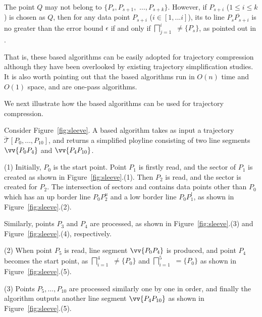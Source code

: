 The point $Q$ may not belong to $\{P_{s}, P_{s+1},$ $\ldots, P_{s+k}\}$.
However, if $P_{s+i}$ ($1\le i\le k$) is chosen as $Q$, then
for any data point $P_{s+i}$ ($i \in [1, ... i]$), its \ped to
line $\overline{P_sP_{s+i}}$ is no greater than the error bound $\epsilon$ if and only if $\bigsqcap_{j=1}^{i}$ $\ne \{P_s\}$, as pointed out in \cite{Zhao:Sleeve}.

 That is, these \cia based algorithms can be easily adopted for trajectory compression although they have been overlooked by existing trajectory simplification studies.  It is also worth pointing out that the \cia based algorithms  run in $O(n)$ time and $O(1)$ space, and are one-pass algorithms.

We next illustrate how the \cia based algorithms can be used for trajectory compression.



\begin{example}
\label{exm-alg-sleeve}
Consider Figure~\ref{fig:sleeve}. A \cia based algorithm takes as input a trajectory $\dddot{\mathcal{T}}[P_0, \ldots, P_{10}]$, and returns a simplified ployline consisting of two line segments $\vv{P_0P_4}$ and  $\vv{P_4P_{10}}$.

\sstab(1) Initially, $P_0$ is the start point. Point $P_1$ is firstly read, and the sector  of $P_1$ is created as shown in Figure~\ref{fig:sleeve}.(1).
Then $P_2$ is read, and the sector   is created for $P_2$. The intersection of sectors  and   contains data points other than $P_0$  which has an up border line $P_0P_2^u$ and a low border line $P_0P_1^l$, as shown in Figure~\ref{fig:sleeve}.(2).

Similarly, points $P_3$ and $P_4$ are processed, as shown in Figure~\ref{fig:sleeve}.(3) and Figure~\ref{fig:sleeve}.(4), respectively.

\sstab(2) When point $P_5$ is read,  line segment $\vv{P_0P_4}$ is produced, and point $P_4$ becomes the start point, as $\bigsqcap_{i=1}^{4}$ $\ne\{P_0\}$ and $\bigsqcap_{i=1}^{5}$ $=\{P_0\}$ as shown in Figure~\ref{fig:sleeve}.(5).


\sstab(3) Points $P_5, \ldots, P_{10}$ are processed similarly one by one in order, and finally the algorithm outputs another line segment $\vv{P_4P_{10}}$ as shown in Figure~\ref{fig:sleeve}.(5).
\end{example}




